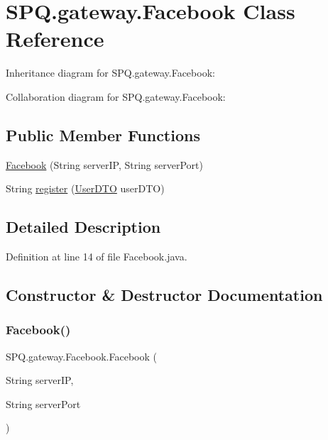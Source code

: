 \hypertarget{class_s_p_q_1_1gateway_1_1_facebook}{}\section{S\+P\+Q.\+gateway.\+Facebook Class Reference}
\label{class_s_p_q_1_1gateway_1_1_facebook}


Inheritance diagram for S\+P\+Q.\+gateway.\+Facebook\+:


Collaboration diagram for S\+P\+Q.\+gateway.\+Facebook\+:
\subsection*{Public Member Functions}
\begin{DoxyCompactItemize}
\item 
\mbox{\hyperlink{class_s_p_q_1_1gateway_1_1_facebook_a428ab89808ef8f9d2d0ac5e60c9135e3}{Facebook}} (String server\+IP, String server\+Port)
\item 
String \mbox{\hyperlink{class_s_p_q_1_1gateway_1_1_facebook_aba03bc89c530d3f2159b3a1eb65c3427}{register}} (\mbox{\hyperlink{class_s_p_q_1_1dto_1_1_user_d_t_o}{User\+D\+TO}} user\+D\+TO)
\end{DoxyCompactItemize}


\subsection{Detailed Description}


Definition at line 14 of file Facebook.\+java.



\subsection{Constructor \& Destructor Documentation}
\mbox{\label{class_s_p_q_1_1gateway_1_1_facebook_a428ab89808ef8f9d2d0ac5e60c9135e3}} 
\subsubsection{\texorpdfstring{Facebook()}{Facebook()}}
{\footnotesize\ttfamily S\+P\+Q.\+gateway.\+Facebook.\+Facebook (\begin{DoxyParamCaption}\item[{String}]{server\+IP,  }\item[{String}]{server\+Port }\end{DoxyParamCaption})}



